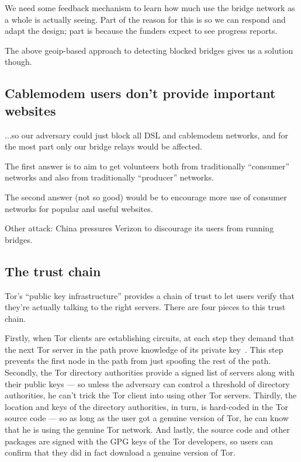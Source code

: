 \documentclass{llncs}
\begin{document}
We need some feedback mechanism to learn how much use the bridge network
as a whole is actually seeing. Part of the reason for this is so we can
respond and adapt the design; part is because the funders expect to see
progress reports.

The above geoip-based approach to detecting blocked bridges gives us a
solution though.

\subsection{Cablemodem users don't provide important websites}
\label{subsec:block-cable}

...so our adversary could just block all DSL and cablemodem networks,
and for the most part only our bridge relays would be affected.

The first answer is to aim to get volunteers both from traditionally
``consumer'' networks and also from traditionally ``producer'' networks.

The second answer (not so good) would be to encourage more use of consumer
networks for popular and useful websites.

Other attack: China pressures Verizon to discourage its users from
running bridges.

\subsection{The trust chain}
\label{subsec:trust-chain}

Tor's ``public key infrastructure'' provides a chain of trust to
let users verify that they're actually talking to the right servers.
There are four pieces to this trust chain.

Firstly, when Tor clients are establishing circuits, at each step
they demand that the next Tor server in the path prove knowledge of
its private key~\cite{tor-design}. This step prevents the first node
in the path from just spoofing the rest of the path. Secondly, the
Tor directory authorities provide a signed list of servers along with
their public keys --- so unless the adversary can control a threshold
of directory authorities, he can't trick the Tor client into using other
Tor servers. Thirdly, the location and keys of the directory authorities,
in turn, is hard-coded in the Tor source code --- so as long as the user
got a genuine version of Tor, he can know that he is using the genuine
Tor network. And lastly, the source code and other packages are signed
with the GPG keys of the Tor developers, so users can confirm that they
did in fact download a genuine version of Tor.
\end{document}
